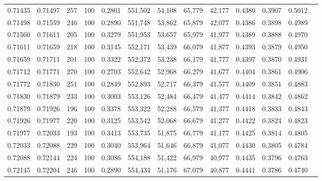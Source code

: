 \begin{tabular}{rrrrrrrrrrrrr}
0.71435 & 0.71497 &   257 & 100 &                                     0.2801 & 551,502 &  54,108 &  65,779 &  42,177 & 0.4380 & 0.3907 & 0.5012 \\
0.71498 & 0.71559 &   246 & 100 &                                     0.2890 & 551,748 &  53,862 &  65,879 &  42,077 & 0.4386 & 0.3898 & 0.4989 \\
0.71560 & 0.71611 &   205 & 100 &                                     0.3279 & 551,953 &  53,657 &  65,979 &  41,977 & 0.4389 & 0.3888 & 0.4970 \\
0.71611 & 0.71659 &   218 & 100 &                                     0.3145 & 552,171 &  53,439 &  66,079 &  41,877 & 0.4393 & 0.3879 & 0.4950 \\
0.71659 & 0.71711 &   201 & 100 &                                     0.3322 & 552,372 &  53,238 &  66,179 &  41,777 & 0.4397 & 0.3870 & 0.4931 \\
0.71712 & 0.71771 &   270 & 100 &                                     0.2703 & 552,642 &  52,968 &  66,279 &  41,677 & 0.4404 & 0.3861 & 0.4906 \\
0.71772 & 0.71830 &   251 & 100 &                                     0.2849 & 552,893 &  52,717 &  66,379 &  41,577 & 0.4409 & 0.3851 & 0.4883 \\
0.71830 & 0.71879 &   233 & 100 &                                     0.3003 & 553,126 &  52,484 &  66,479 &  41,477 & 0.4414 & 0.3842 & 0.4862 \\
0.71879 & 0.71926 &   196 & 100 &                                     0.3378 & 553,322 &  52,288 &  66,579 &  41,377 & 0.4418 & 0.3833 & 0.4843 \\
0.71926 & 0.71977 &   220 & 100 &                                     0.3125 & 553,542 &  52,068 &  66,679 &  41,277 & 0.4422 & 0.3824 & 0.4823 \\
0.71977 & 0.72033 &   193 & 100 &                                     0.3413 & 553,735 &  51,875 &  66,779 &  41,177 & 0.4425 & 0.3814 & 0.4805 \\
0.72033 & 0.72088 &   229 & 100 &                                     0.3040 & 553,964 &  51,646 &  66,879 &  41,077 & 0.4430 & 0.3805 & 0.4784 \\
0.72088 & 0.72144 &   224 & 100 &                                     0.3086 & 554,188 &  51,422 &  66,979 &  40,977 & 0.4435 & 0.3796 & 0.4763 \\
0.72145 & 0.72204 &   246 & 100 &                                     0.2890 & 554,434 &  51,176 &  67,079 &  40,877 & 0.4441 & 0.3786 & 0.4740 \\

\end{tabular}
